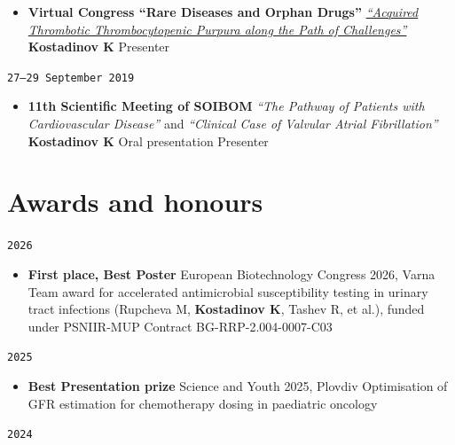 \documentclass[
  10.5pt,
  a4paper,
  DIV=11,
  numbers=noendperiod]{scrartcl}
\providecommand{\tightlist}{%
  \setlength{\itemsep}{0pt}\setlength{\parskip}{0pt}}
\let\oldtexttt\texttt
\renewcommand{\texttt}[1]{{\color{cvbronze}\small\oldtexttt{#1}}}
\begin{document}
\begin{itemize}
\tightlist
\item
  \textbf{Virtual Congress ``Rare Diseases and Orphan Drugs''}
  \textbar{} \emph{\href{https://youtu.be/R_UbvDcyTxs}{``Acquired
  Thrombotic Thrombocytopenic Purpura along the Path of Challenges''}}
  \textbar{} \textbf{Kostadinov K} \textbar{} Presenter
\end{itemize}

\texttt{27–29\ September\ 2019}

\begin{itemize}
\tightlist
\item
  \textbf{11th Scientific Meeting of SOIBOM} \textbar{} \emph{``The
  Pathway of Patients with Cardiovascular Disease''} and
  \emph{``Clinical Case of Valvular Atrial Fibrillation''} \textbar{}
  \textbf{Kostadinov K} \textbar{} Oral presentation \textbar{}
  Presenter
\end{itemize}

\section{Awards and honours}\label{awards-and-honours}

\texttt{2026}

\begin{itemize}
\tightlist
\item
  \textbf{First place, Best Poster} \textbar{} European Biotechnology
  Congress 2026, Varna \textbar{} Team award for accelerated
  antimicrobial susceptibility testing in urinary tract infections
  (Rupcheva M, \textbf{Kostadinov K}, Tashev R, et al.), funded under
  PSNIIR-MUP Contract BG-RRP-2.004-0007-C03
\end{itemize}

\texttt{2025}

\begin{itemize}
\tightlist
\item
  \textbf{Best Presentation prize} \textbar{} Science and Youth 2025,
  Plovdiv \textbar{} Optimisation of GFR estimation for chemotherapy
  dosing in paediatric oncology
\end{itemize}

\texttt{2024}
\end{document}
